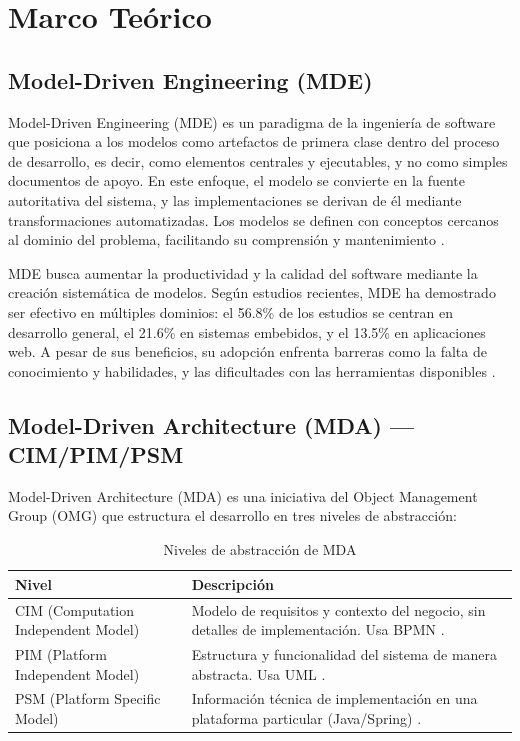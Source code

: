 \documentclass[journal,onecolumn]{IEEEtran}
\begin{document}
\section{Marco Teórico}

\subsection{Model-Driven Engineering (MDE)}

Model-Driven Engineering (MDE) es un paradigma de la ingeniería de software que posiciona a los modelos como artefactos de primera clase dentro del proceso de desarrollo, es decir, como elementos centrales y ejecutables, y no como simples documentos de apoyo. En este enfoque, el modelo se convierte en la fuente autoritativa del sistema, y las implementaciones se derivan de él mediante transformaciones automatizadas. Los modelos se definen con conceptos cercanos al dominio del problema, facilitando su comprensión y mantenimiento \cite{Bucchiarone2020}.

MDE busca aumentar la productividad y la calidad del software mediante la creación sistemática de modelos. Según estudios recientes, MDE ha demostrado ser efectivo en múltiples dominios: el 56.8\% de los estudios se centran en desarrollo general, el 21.6\% en sistemas embebidos, y el 13.5\% en aplicaciones web. A pesar de sus beneficios, su adopción enfrenta barreras como la falta de conocimiento y habilidades, y las dificultades con las herramientas disponibles \cite{Bucchiarone2020}.

\subsection{Model-Driven Architecture (MDA) --- CIM/PIM/PSM}

Model-Driven Architecture (MDA) es una iniciativa del Object Management Group (OMG) que estructura el desarrollo en tres niveles de abstracción:

\begin{table}[H]
	\centering
	\caption{Niveles de abstracción de MDA}
	\label{tab:mda-niveles}
	\begin{tabular}{|l|p{9cm}|}
		\hline
		\textbf{Nivel} & \textbf{Descripción} \\
		\hline
		CIM (Computation Independent Model) & Modelo de requisitos y contexto del negocio, sin detalles de implementación. Usa BPMN \cite{Zammel2025}. \\
		\hline
		PIM (Platform Independent Model) & Estructura y funcionalidad del sistema de manera abstracta. Usa UML \cite{Zammel2025}. \\
		\hline
		PSM (Platform Specific Model) & Información técnica de implementación en una plataforma particular (Java/Spring) \cite{Zammel2025}. \\
		\hline
	\end{tabular}
\end{table}
\end{document}
